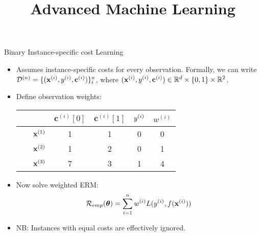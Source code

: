\documentclass[11pt,compress,t,notes=noshow, xcolor=table]{beamer}
\title{Advanced Machine Learning}
\date{}
\newcommand{\cv}{\mathbf{c}}    %
\begin{document}



\sloppy





\begin{vbframe}{Binary Instance-specific cost Learning}
    \footnotesize
    \begin{itemize}
        \footnotesize
        \item Assumes instance-specific costs for every observation. Formally, we can write $\D^{(n)} = \{(\xi, \yi, \cv^{(i)})\}_i^n$, where $(\xi, \yi, \cv^{(i)}) \in \mathbb{R}^d \times \{0,1\} \times \mathbb{R}^2$.
        
        \item Define observation weights: 

        \begin{center}
                            \begin{tabular}{cc|cccc}\
        			& & $\cv^{(i)}[0]$ & $\cv^{(i)}[1]$ & $y^{(i)}$ & $w^{(i)}$ \\
        			\hline & $\mathbf{x}^{(1)}$ & 1 & 1 & 0 & 0\\
        			& $\mathbf{x}^{(2)}$ & 1 & 2 & 0 & 1\\
        			& $\mathbf{x}^{(3)}$ & 7 & 3 & 1 & 4\\

                \end{tabular}
        \end{center}
        \item Now solve weighted ERM:
        \begin{equation*}
            \mathcal{R}_{emp}(\boldsymbol{\theta}) = \sum_{i=1}^{n}w^{(i)}L(y^{(i)},f(\mathbf{x}^{(i)}))
        \end{equation*}
        \item NB: Instances with equal costs are effectively ignored.
        \end{itemize}
            
\end{vbframe}
\end{document}
